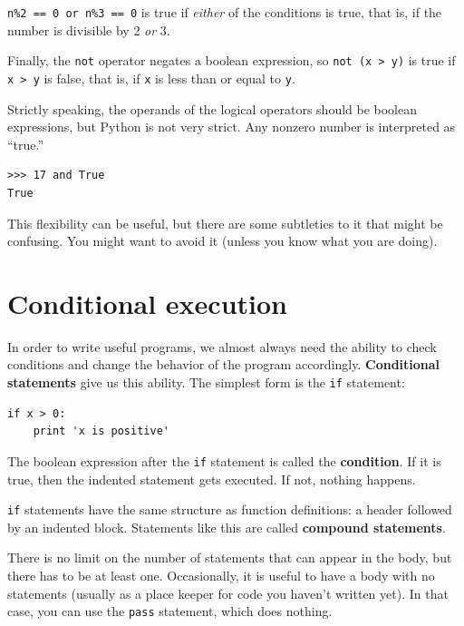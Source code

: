 \documentclass[10pt]{book}
\begin{document}

{\tt n\%2 == 0 or n\%3 == 0} is true if {\em either} of the conditions
is true, that is, if the number is divisible by 2 {\em or} 3.

Finally, the {\tt not} operator negates a boolean
expression, so {\tt not (x > y)} is true if {\tt x > y} is false,
that is, if {\tt x} is less than or equal to {\tt y}.

Strictly speaking, the operands of the logical operators should be
boolean expressions, but Python is not very strict.
Any nonzero number is interpreted as ``true.''

\beforeverb
\begin{verbatim}
>>> 17 and True
True
\end{verbatim}
\afterverb
%
This flexibility can be useful, but there are some subtleties to
it that might be confusing.  You might want to avoid it (unless
you know what you are doing).


\section{Conditional execution}
\label{conditional execution}


In order to write useful programs, we almost always need the ability
to check conditions and change the behavior of the program
accordingly.  {\bf Conditional statements} give us this ability.  The
simplest form is the {\tt if} statement:

\beforeverb
\begin{verbatim}
if x > 0:
    print 'x is positive'
\end{verbatim}
\afterverb
%
The boolean expression after the {\tt if} statement is
called the {\bf condition}.  If it is true, then the indented
statement gets executed.  If not, nothing happens.


{\tt if} statements have the same structure as function definitions:
a header followed by an indented block.  Statements like this are
called {\bf compound statements}.

There is no limit on the number of statements that can appear in
the body, but there has to be at least one.
Occasionally, it is useful to have a body with no statements (usually
as a place keeper for code you haven't written yet).  In that
case, you can use the {\tt pass} statement, which does nothing.
\end{document}

